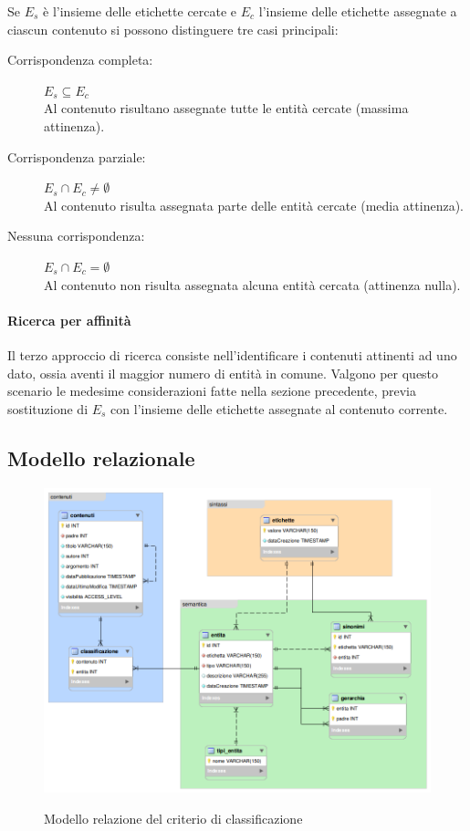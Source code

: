 Se $E_s$ è l'insieme delle etichette cercate e $E_c$ l'insieme delle etichette assegnate a ciascun contenuto si possono distinguere tre casi principali:
\begin{description}
\item[Corrispondenza completa:] $E_s \subseteq E_c$ \hfill \\
Al contenuto risultano assegnate tutte le entità cercate (massima attinenza).
\item[Corrispondenza parziale:] $E_s \cap E_c \neq \emptyset$ \hfill \\
Al contenuto risulta assegnata parte delle entità cercate (media attinenza).
\item[Nessuna corrispondenza:] $E_s \cap E_c = \emptyset$\hfill \\
Al contenuto non risulta assegnata alcuna entità cercata (attinenza nulla).
\end{description}

\paragraph{Ricerca per affinità}
Il terzo approccio di ricerca consiste nell'identificare i contenuti attinenti ad uno dato, ossia aventi il maggior numero di entità in comune. Valgono per questo scenario le medesime considerazioni fatte nella sezione precedente, previa sostituzione di $E_s$ con l'insieme delle etichette assegnate al contenuto corrente.

\subsection{Modello relazionale}

\begin{figure}[ht]
\begin{center}
\includegraphics[width=14.7cm]{modello-er.png}
\label{fig:tesi:stage:er:modello}
\caption{Modello relazione del criterio di classificazione}
\end{center}
\end{figure}

